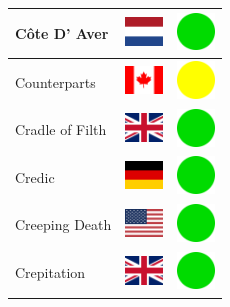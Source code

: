 \documentclass[12pt, a4paper, twoside]{report}
\begin{document}
\begin{center}
\begin{longtable}{|p{5cm}|p{2cm}|p{2cm}|}
 Côte D' Aver                                               & \includegraphics[width=1cm]{../4x3/nl} &   \includegraphics[width=1cm]{../likes/y} \\ \hline
 Counterparts                                               & \includegraphics[width=1cm]{../4x3/ca} &   \includegraphics[width=1cm]{../likes/m} \\ \hline
 Cradle of Filth                                            & \includegraphics[width=1cm]{../4x3/gb} &   \includegraphics[width=1cm]{../likes/y} \\ \hline
 Credic                                                     & \includegraphics[width=1cm]{../4x3/de} &   \includegraphics[width=1cm]{../likes/y} \\ \hline
 Creeping Death                                             & \includegraphics[width=1cm]{../4x3/us} &   \includegraphics[width=1cm]{../likes/y} \\ \hline
 Crepitation                                                & \includegraphics[width=1cm]{../4x3/gb} &   \includegraphics[width=1cm]{../likes/y} \\ \hline

\end{longtable}
\end{center}
\end{document}
